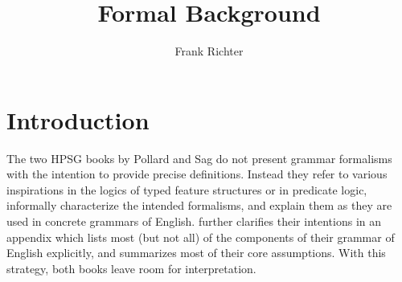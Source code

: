 \documentclass[output=paper
                ,modfonts
                ,nonflat
	        ,collection
	        ,collectionchapter
	        ,collectiontoclongg
 	        ,biblatex
                ,babelshorthands
                ,newtxmath
                ,draftmode
                ,colorlinks, citecolor=brown
]{./langsci/langscibook}
\author{%
 Frank Richter\affiliation{Goethe Universität Frankfurt}%
}
\title{Formal Background}
\begin{document}
\maketitle
\label{chap-formal-background}

{

\section{Introduction}
\label{sec-introduction}

The two HPSG books by Pollard and Sag
\citep{PollardSag1987,PollardSag1994} do not present grammar formalisms
with the intention to provide precise definitions.
Instead they refer to various inspirations in the
logics of typed feature structures or in predicate logic, informally
characterize the intended formalisms, and explain them as they are
used in concrete grammars of English. \citet{PollardSag1994} further clarifies
their intentions in an appendix which lists most (but not all) of the components
of their grammar of English explicitly, and summarizes most of their core
assumptions. With this strategy, both books leave room for
interpretation.

}
\end{document}
